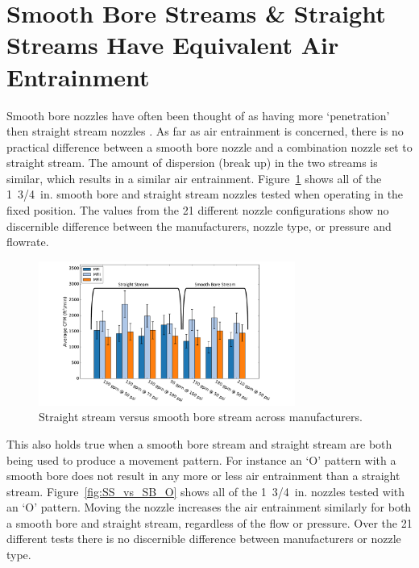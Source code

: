 \documentclass[12pt,oneside]{book}
\begin{document}
\section{Smooth Bore Streams \& Straight Streams Have Equivalent Air Entrainment} 
Smooth bore nozzles have often been thought of as having more `penetration' then straight stream nozzles \cite{Klaene:1}. As far as air entrainment is concerned, there is no practical difference between a smooth bore nozzle and a combination nozzle set to straight stream. The amount of dispersion (break up) in the two streams is similar, which results in a similar air entrainment. Figure~\ref{fig:SS_vs_SB} shows all of the 1~3/4~in. smooth bore and straight stream nozzles tested when operating in the fixed position. The values from the 21 different nozzle configurations show no discernible difference between the manufacturers, nozzle type, or pressure and flowrate.

\begin{figure}[H]
\centering
\includegraphics[width=0.75\textwidth]{Figures/Air_Entrainment/SB_SS_All_Manufacture.pdf}
\caption[Straight Stream vs. Smooth Bore Stream Across Manufacturers]{Straight stream versus smooth bore stream across manufacturers.}
\label{fig:SS_vs_SB}
\end{figure}

This also holds true when a smooth bore stream and straight stream are both being used to produce a movement pattern. For instance an `O' pattern with a smooth bore does not result in any more or less air entrainment than a straight stream. Figure~\ref{fig:SS_vs_SB_O} shows all of the 1~3/4~in. nozzles tested with an `O' pattern. Moving the nozzle increases the air entrainment similarly for both a smooth bore and straight stream, regardless of the flow or pressure. Over the 21 different tests there is no discernible difference between manufacturers or nozzle type. 
\end{document}
